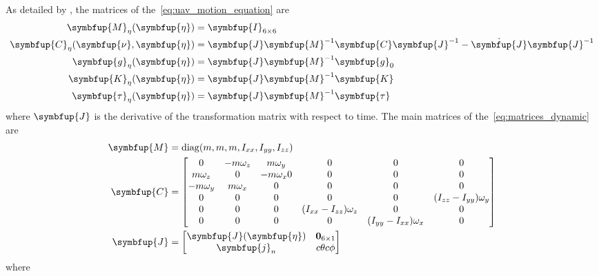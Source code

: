 As detailed by \citet{geronel2023}, the matrices of the~\cref{eq:uav_motion_equation} are
%
\begin{align}
    \symbfup{M}_{\eta}(\symbfup{\eta}) &= \symbfup{I}_{6\times6} \\
    \symbfup{C}_{\eta}(\symbfup{\nu},\symbfup{\eta}) &= \symbfup{J}\symbfup{M}^{-1}\symbfup{C}\symbfup{J}^{-1} - \dot{\symbfup{J}}\symbfup{J}^{-1} \\
    \symbfup{g}_{\eta}(\symbfup{\eta}) &= \symbfup{J}\symbfup{M}^{-1}\symbfup{g}_{0} \\
    \symbfup{K}_{\eta}(\symbfup{\eta}) &= \symbfup{J}\symbfup{M}^{-1}\symbfup{K} \\
    \symbfup{\tau}_{\eta}(\symbfup{\eta}) &= \symbfup{J}\symbfup{M}^{-1}\symbfup{\tau}
    \label{eq:matrices_dynamic}
\end{align}
%
where \(\symbfup{J}\) is the derivative of the transformation matrix with respect to time. The main matrices of the~\cref{eq:matrices_dynamic} are
%
\begin{align}
    \symbfup{M} &= \diag(m,m,m,I_{xx},I_{yy},I_{zz})
    \label{eq:diag_M} \\
    \symbfup{C} &= \begin{bmatrix}
        0 & -m\omega_z & m\omega_y & 0 & 0 & 0 \\
        m\omega_z & 0 & -m\omega_x 0 & 0 & 0 & 0\\
        -m\omega_y & m\omega_x & 0 & 0 & 0 & 0 \\
        0 & 0 & 0 & 0 & 0 & (I_{zz}-I_{yy})\omega_y \\
        0 & 0 & 0 & (I_{xx}-I_{zz})\omega_z & 0 & 0 \\
        0 & 0 & 0 & 0 & (I_{yy}-I_{xx})\omega_x& 0 \\
    \end{bmatrix}
    \label{eq:coriolis_matrix} \\
    \symbfup{J} &= \begin{bmatrix}
        \symbfup{J}(\symbfup{\eta}) & \mathbf{0}_{6\times 1} \\
        \symbfup{j}_n & c\theta c\phi
    \end{bmatrix}
    \label{eq:transformation}
\end{align}
%
where